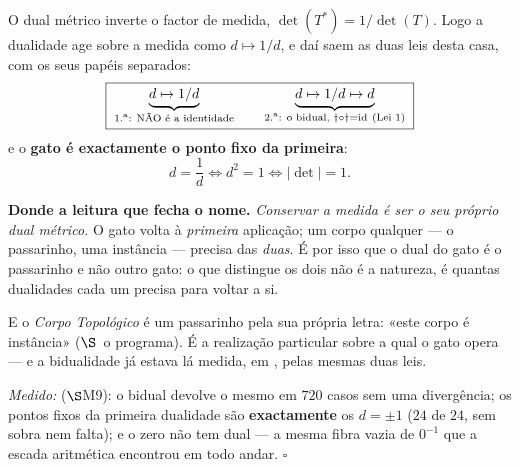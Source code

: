 \documentclass[livro.tex]{subfiles}
\begin{document}
\begin{corolario}\label{cor:bidualidade}
O dual métrico inverte o factor de medida, $\det(T^{\ast})=1/\det(T)$.
Logo a dualidade age sobre a medida como $d\mapsto 1/d$, e daí saem as
duas leis desta casa, com os seus papéis separados:
\[
\boxed{\;
\underbrace{d\mapsto 1/d}_{\text{1.\textsuperscript{a}: NÃO é a
identidade}}
\qquad
\underbrace{d\mapsto 1/d\mapsto d}_{\text{2.\textsuperscript{a}: o
bidual, }\dagger\circ\dagger=\mathrm{id}\ (\text{Lei~1})}\;}
\]
e o \textbf{gato é exactamente o ponto fixo da primeira}:
\[
d=\frac1d
\iff d^{2}=1
\iff |\det|=1 .
\]

\textbf{Donde a leitura que fecha o nome.} \emph{Conservar a medida é ser
o seu próprio dual métrico.} O gato volta à \emph{primeira} aplicação; um
corpo qualquer --- o passarinho, uma instância --- precisa das
\emph{duas}. É por isso que o dual do gato é o passarinho e não outro
gato: o que distingue os dois não é a natureza, é quantas dualidades cada
um precisa para voltar a si.

E o \emph{Corpo Topológico} é um passarinho pela sua própria letra: «este
corpo é instância» ($\S$~o programa). É a realização particular sobre a
qual o gato opera --- e a bidualidade já estava lá medida, em
, pelas mesmas duas leis.

\emph{Medido:}  ($\S$M9): o bidual
devolve o mesmo em $720$ casos sem uma divergência; os pontos fixos da
primeira dualidade são \textbf{exactamente} os $d=\pm1$ ($24$ de $24$,
sem sobra nem falta); e o zero não tem dual --- a mesma fibra vazia de
$0^{-1}$ que a escada aritmética encontrou em todo andar. $\square$
\end{corolario}
\end{document}
